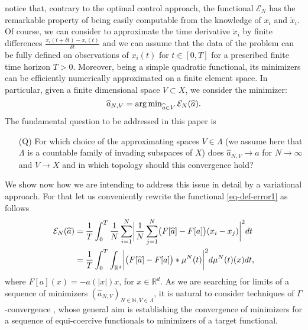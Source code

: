 notice that, contrary to the optimal control approach, the functional $\mathcal E_N$ has the remarkable property of being easily computable from the knowledge of $x_i$ and $\dot{x}_i$. Of course, we can consider to approximate the time derivative $\dot{x}_i$ by finite differences $\frac{x_i(t+\delta t)- x_i(t)}{\delta t}$ and we can assume that the data of the problem can be fully defined on observations of $x_i(t)$ for $t \in [0,T]$ for a prescribed finite time horizon $T>0$. Moreover, being a simple quadratic functional, its minimizers can be efficiently numerically approximated on a finite element space. In particular, given a finite dimensional space $V \subset X$, we consider the minimizer:
\begin{equation}\label{fdproxy}
\widehat a_{N,V} = \operatorname{arg\,min}_{\widehat a \in V} \mathcal E_N(\widehat a).
\end{equation}
The fundamental question to be addressed in this paper is
\begin{itemize}
\item[(Q)] For which choice of the approximating spaces $V \in \Lambda$ (we assume here that $\Lambda$ is a countable family of invading subspaces of $X$) does $\widehat a_{N,V} \to a$ for $N \to \infty$ and $V \to X$ and 
in which topology should this convergence hold?
\end{itemize}
We show now how  we are intending to address this issue in detail by a variational approach.
For that let us conveniently rewrite the functional \eqref{eq-def-error1} as follows
\begin{align}\label{pirlo}
	\begin{split}
	\mathcal E_N(\widehat a) & = \frac{1}{T}\int_0^T\frac{1}{N}\sum_{i=1}^N\biggl|\frac{1}{N}\sum_{j=1}^N
			\bigl(F[\widehat a]-F[a]\bigr)(x_i-x_j)\biggr|^2 dt\\
			& = \frac{1}{T}\int_0^T \int_{\mathbb{R}^d} \biggl|\bigl(F[\widehat a]-F[a]\bigr)\ast\mu^N(t)\biggr|^2d\mu^N(t)(x)dt,
	\end{split}
\end{align}
where $F[a](x) =-a(| x |)x$, for $x \in \mathbb R^{d}$.  As we are searching for limits of a sequence of minimizers $(\widehat a_{N,V})_{N \in \mathbb N, V \in \Lambda}$, it is natural to consider  techniques of $\Gamma$-convergence \cite{MR1201152}, whose general aim is establishing the convergence of minimizers for a sequence of equi-coercive functionals to minimizers of a target functional.


